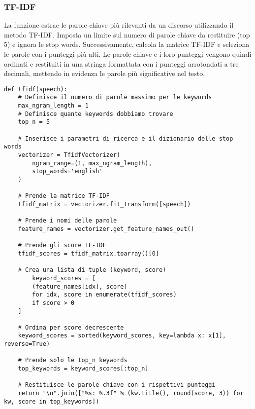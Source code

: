 \documentclass[12pt]{article}
\begin{document}
			\subsubsection{TF-IDF}
La funzione estrae le parole chiave più rilevanti da un discorso utilizzando il metodo TF-IDF. Imposta un limite sul numero di parole chiave da restituire (top 5) e ignora le stop words. Successivamente, calcola la matrice TF-IDF e seleziona le parole con i punteggi più alti. Le parole chiave e i loro punteggi vengono quindi ordinati e restituiti in una stringa formattata con i punteggi arrotondati a tre decimali, mettendo in evidenza le parole più significative nel testo.	
	\begin{lstlisting}	
def tfidf(speech):
	# Definisce il numero di parole massimo per le keywords
	max_ngram_length = 1
	# Definisce quante keywords dobbiamo trovare
	top_n = 5

	# Inserisce i parametri di ricerca e il dizionario delle stop words
	vectorizer = TfidfVectorizer(
		ngram_range=(1, max_ngram_length),
		stop_words='english'
	)

	# Prende la matrice TF-IDF
	tfidf_matrix = vectorizer.fit_transform([speech])
	
	# Prende i nomi delle parole
	feature_names = vectorizer.get_feature_names_out()
	
	# Prende gli score TF-IDF
	tfidf_scores = tfidf_matrix.toarray()[0]

	# Crea una lista di tuple (keyword, score)
		keyword_scores = [
		(feature_names[idx], score)
		for idx, score in enumerate(tfidf_scores)
		if score > 0
	]

	# Ordina per score decrescente
	keyword_scores = sorted(keyword_scores, key=lambda x: x[1], reverse=True)
	
	# Prende solo le top_n keywords
	top_keywords = keyword_scores[:top_n]
	
	# Restituisce le parole chiave con i rispettivi punteggi
	return "\n".join(["%s: %.3f" % (kw.title(), round(score, 3)) for kw, score in top_keywords])

	\end{lstlisting}
\end{document}
